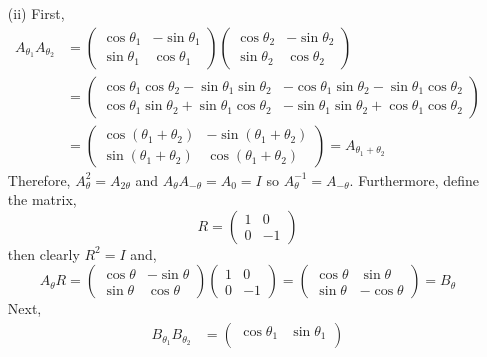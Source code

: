 \documentclass[12pt]{extarticle}
\begin{document}
\begin{enumerate}
\item[(ii)]
First, 
\begin{align*}
A_{\theta_1} A_{\theta_2}  & = 
\begin{pmatrix}
\cos{\theta_1} & - \sin{\theta_1} \\
\sin{\theta_1} & \cos{\theta_1}
\end{pmatrix}
\begin{pmatrix}
\cos{\theta_2} & - \sin{\theta_2} \\
\sin{\theta_2} & \cos{\theta_2}
\end{pmatrix} 
\\
& = 
\begin{pmatrix}
\cos{\theta_1} \cos{\theta_2} - \sin{\theta_1} \sin{\theta_2} & - \cos{\theta_1} \sin{\theta_2} - \sin{\theta_1} \cos{\theta_2}
\\
\cos{\theta_1} \sin{\theta_2} + \sin{\theta_1} \cos{\theta_2} & - \sin{\theta_1} \sin{\theta_2} + \cos{\theta_1} \cos{\theta_2} 
\end{pmatrix}
\\
& = 
\begin{pmatrix}
\cos{(\theta_1 + \theta_2)} & - \sin{(\theta_1 + \theta_2)} \\
\sin{(\theta_1 + \theta_2)} & \cos{(\theta_1 + \theta_2)}
\end{pmatrix}
= A_{\theta_1 + \theta_2}
\end{align*}
Therefore, $A_\theta^2 = A_{2 \theta}$ and $A_{\theta} A_{-\theta} = A_{0} = I$ so $A_{\theta}^{-1} = A_{- \theta}$. Furthermore, define the matrix,
\[ R = 
\begin{pmatrix}
1 & 0 \\
0 & -1
\end{pmatrix} \]
then clearly $R^2 = I$ and,
\[ A_\theta R = 
\begin{pmatrix}
\cos{\theta} & - \sin{\theta}\\
\sin{\theta} &  \cos{\theta}
\end{pmatrix} 
\begin{pmatrix}
1 & 0 \\
0 & -1
\end{pmatrix} 
=
\begin{pmatrix}
\cos{\theta} &  \sin{\theta}\\
\sin{\theta} &  - \cos{\theta}
\end{pmatrix} 
= B_\theta
\]
Next,
\begin{align*}
B_{\theta_1} B_{\theta_2}  & = 
\begin{pmatrix}
\cos{\theta_1} & \sin{\theta_1} \\

\end{pmatrix}
\end{align*}
\end{enumerate}
\end{document}
